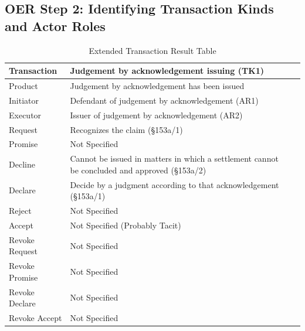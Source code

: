 \begin{landscape}
\section{OER Step 2: Identifying Transaction Kinds and Actor Roles}

\begin{table}[h]
\caption{Extended Transaction Result Table}
\label{tab:etrt}
\begin{tabular}{|l||l|l|}
\hline
Transaction  & Judgement by acknowledgement issuing (TK1) \\ \hline
Product      & Judgement by acknowledgement has been issued   \\ \hline
Initiator      & Defendant of judgement by acknowledgement (AR1) \\ \hline
Executor       & Issuer of judgement by acknowledgement (AR2)      \\ \hline
Request        & Recognizes the claim (\S153a/1)   \\ \hline
Promise        & Not Specified   \\ \hline
Decline        &  Cannot be issued in matters in which a settlement cannot be concluded and approved  (\S153a/2)  \\ \hline
Declare        & Decide by a judgment according to that acknowledgement (\S153a/1)  \\ \hline
Reject         &  Not Specified   \\ \hline
Accept         & Not Specified (Probably Tacit) \\ \hline
Revoke Request & Not Specified \\ \hline
Revoke Promise & Not Specified \\ \hline
Revoke Declare & Not Specified  \\ \hline
Revoke Accept  &  Not Specified   \\ \hline
\end{tabular}
\end{table}


\end{landscape}
